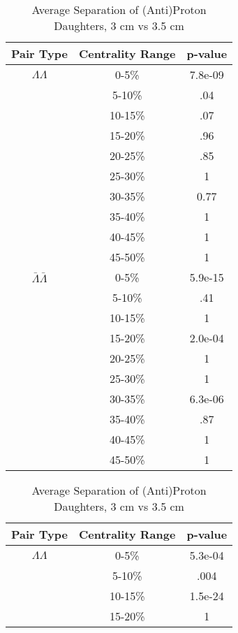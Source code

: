 \begin{table}
\begin{minipage}{18pc}
\caption{Average Separation of (Anti)Proton Daughters, 3 cm vs 2.5 cm} \label{tab:AvgSepProtDaughters3cmVs25cm}
\begin{center}
\begin{tabular}{| c | c | c |}
  \hline                       
  Pair Type & Centrality Range & p-value \\
  \hline
  $\Lambda\Lambda$ & 0-5\% & 7.8e-09 \\
   & 5-10\%  & .04 \\
   & 10-15\% & .07 \\
   & 15-20\% & .96 \\
   & 20-25\% & .85 \\
   & 25-30\% & 1 \\
   & 30-35\% & 0.77 \\
   & 35-40\% & 1 \\
   & 40-45\% & 1 \\
   & 45-50\% & 1 \\
   \hline
  $\bar{\Lambda}\bar{\Lambda}$ &  0-5\% & 5.9e-15 \\
   & 5-10\% & .41 \\
   & 10-15\% & 1 \\
   & 15-20\% & 2.0e-04 \\
   & 20-25\% & 1 \\
   & 25-30\% & 1 \\
   & 30-35\% & 6.3e-06 \\
   & 35-40\% & .87 \\
   & 40-45\% & 1 \\
   & 45-50\% & 1 \\
  \hline  
\end{tabular}
\end{center}
\end{minipage}
\begin{minipage}{18pc}
\caption{Average Separation of (Anti)Proton Daughters, 3 cm vs 3.5 cm} \label{tab:AvgSepProtDaughters3cmVs35cm}
\begin{center}
\begin{tabular}{| c | c | c |}
  \hline                       
  Pair Type & Centrality Range & p-value \\
  \hline
  $\Lambda\Lambda$ & 0-5\% & 5.3e-04 \\
   & 5-10\%  & .004 \\
   & 10-15\% & 1.5e-24 \\
   & 15-20\% & 1 \\

\end{tabular}
\end{center}
\end{minipage}
\end{table}
